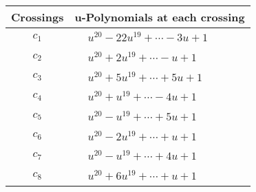 \documentclass[1p]{elsarticle_modified}
\theoremstyle{definition}
\begin{document}
\begin{tabular}{m{50pt}|m{274pt}}
Crossings & \hspace{64pt}u-Polynomials at each crossing \\
\hline $$\begin{aligned}c_{1}\end{aligned}$$&$\begin{aligned}
&u^{20}-22 u^{19}+\cdots-3 u+1
\end{aligned}$\\
\hline $$\begin{aligned}c_{2}\end{aligned}$$&$\begin{aligned}
&u^{20}+2 u^{19}+\cdots- u+1
\end{aligned}$\\
\hline $$\begin{aligned}c_{3}\end{aligned}$$&$\begin{aligned}
&u^{20}+5 u^{19}+\cdots+5 u+1
\end{aligned}$\\
\hline $$\begin{aligned}c_{4}\end{aligned}$$&$\begin{aligned}
&u^{20}+u^{19}+\cdots-4 u+1
\end{aligned}$\\
\hline $$\begin{aligned}c_{5}\end{aligned}$$&$\begin{aligned}
&u^{20}- u^{19}+\cdots+5 u+1
\end{aligned}$\\
\hline $$\begin{aligned}c_{6}\end{aligned}$$&$\begin{aligned}
&u^{20}-2 u^{19}+\cdots+u+1
\end{aligned}$\\
\hline $$\begin{aligned}c_{7}\end{aligned}$$&$\begin{aligned}
&u^{20}- u^{19}+\cdots+4 u+1
\end{aligned}$\\
\hline $$\begin{aligned}c_{8}\end{aligned}$$&$\begin{aligned}
&u^{20}+6 u^{19}+\cdots+u+1
\end{aligned}$\\

\end{tabular}
\end{document}
